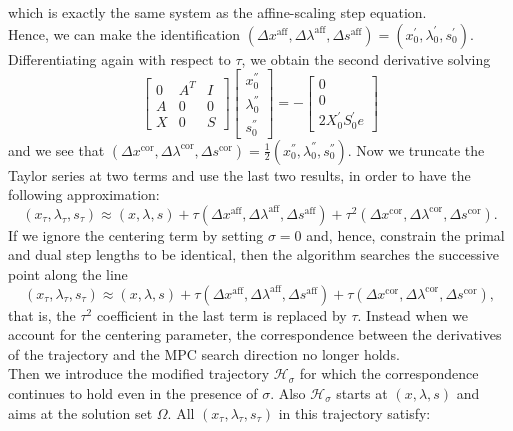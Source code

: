 \documentclass[a4paper,10 pt,titlepage,twoside]{book}
\theoremstyle{plain}
\theoremstyle{definition}
\theoremstyle{remark}
\begin{document}
which is exactly the same system as the affine-scaling step equation.\\
Hence, we can make the identification $(\Delta x^{\text{aff}},\Delta \lambda^{\text{aff}},\Delta s^{\text{aff}})=(x^{'}_{0},\lambda^{'}_{0},s^{'}_{0})$. Differentiating again with respect to $\tau$, we obtain the second derivative solving
\begin{equation*}
\begin{bmatrix}
0&A^{T}&I \\A&0&0\\X&0&S
\end{bmatrix}\begin{bmatrix}
x_{0}^{''}\\\lambda_{0}^{''}\\s_{0}^{''}
\end{bmatrix}=-\begin{bmatrix}
0\\0\\2X^{'}_{0}S^{'}_{0}e
\end{bmatrix}
\end{equation*}
and we see that $(\Delta x^{\text{cor}},\Delta \lambda^{\text{cor}},\Delta s^{\text{cor}})=\frac{1}{2}(x^{''}_{0},\lambda^{''}_{0},s^{''}_{0})$. Now we truncate the Taylor series at two terms and use the last two results, in order to have the following approximation:
\begin{equation*}
(x_{\tau},\lambda_{\tau}, s_{\tau})\approx(x, \lambda, s)+ \tau(\Delta x^{\text{aff}},\Delta \lambda^{\text{aff}},\Delta s^{\text{aff}})+\tau^{2}(\Delta x^{\text{cor}},\Delta \lambda^{\text{cor}},\Delta s^{\text{cor}}).
\end{equation*}
If we ignore the centering term  by setting $\sigma =0$ and, hence, constrain the primal and dual step lengths to be identical, then the algorithm searches the successive point along the line
\begin{equation}
(x_{\tau},\lambda_{\tau}, s_{\tau})\approx(x, \lambda, s)+ \tau(\Delta x^{\text{aff}},\Delta \lambda^{\text{aff}},\Delta s^{\text{aff}})+\tau(\Delta x^{\text{cor}},\Delta \lambda^{\text{cor}},\Delta s^{\text{cor}}),
\end{equation} 
that is, the $\tau^{2}$ coefficient in the last term is replaced by $\tau$. Instead when we account for the centering parameter, the correspondence between the derivatives of the trajectory and the MPC search direction no longer holds. \\
Then we introduce the modified trajectory $\mathcal{H}_{\sigma}$ for which the correspondence continues to hold even in the presence of $\sigma$. Also $\mathcal{H}_{\sigma}$ starts at $(x, \lambda, s)$ and aims at the solution set $\Omega$. All $(x_{\tau},\lambda_{\tau},s_{\tau})$ in this trajectory satisfy:
\end{document}
